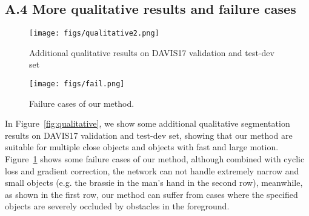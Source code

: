 \documentclass{article}
\begin{document}
\subsection*{A.4 More qualitative results and failure cases}
\begin{figure}
\begin{minipage}{\textwidth}
    \centering
    \texttt{[image: figs/qualitative2.png]}
    \caption{Additional qualitative results on DAVIS17 validation and test-dev set}
    \label{fig:qualitative}
\end{minipage}

\begin{minipage}{\textwidth}
    \centering
    \texttt{[image: figs/fail.png]}
    \caption{Failure cases of our method.}
    \label{fig:fail}
\end{minipage}
\end{figure}
In Figure~\ref{fig:qualitative}, we show some additional qualitative segmentation results on DAVIS17 validation and test-dev set, showing that our method are suitable for multiple close objects and objects with fast and large motion. Figure~\ref{fig:fail} shows some failure cases of our method, although combined with cyclic loss and gradient correction, the network can not handle extremely narrow and small objects (e.g. the brassie in the man's hand in the second row), meanwhile, as shown in the first row, our method can suffer from cases where the specified objects are severely occluded by obstacles in the foreground.
\end{document}
